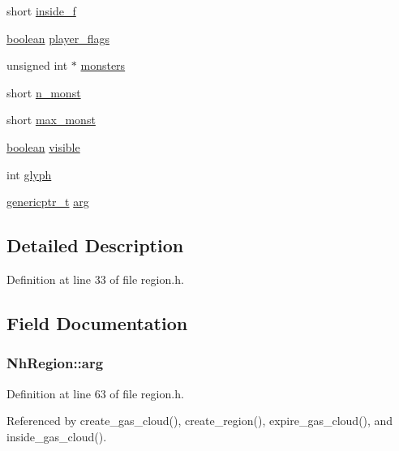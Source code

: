 \begin{DoxyCompactItemize}
\item 
short \hyperlink{structNhRegion_a91718cb4cbceb766dad22d61e5b407fe}{inside\+\_\+f}
\item 
\hyperlink{global_8h_a531b10dd351aa162d7dcccd1966308b8}{boolean} \hyperlink{structNhRegion_a640adecacc9ab6c30831b9b35f6c1e5d}{player\+\_\+flags}
\item 
unsigned int $\ast$ \hyperlink{structNhRegion_a22e5c3cedd81f1f8f83ee6badc4e0ceb}{monsters}
\item 
short \hyperlink{structNhRegion_a03e540a957b87fbd016dbee3c3c0cb9c}{n\+\_\+monst}
\item 
short \hyperlink{structNhRegion_a26e6ec350a157299cdd03820faf5948b}{max\+\_\+monst}
\item 
\hyperlink{global_8h_a531b10dd351aa162d7dcccd1966308b8}{boolean} \hyperlink{structNhRegion_a2ab12427b9c9d84da999feba4f7ea9cd}{visible}
\item 
int \hyperlink{structNhRegion_ad20e42df1758728ae40670635d7c6af5}{glyph}
\item 
\hyperlink{tradstdc_8h_ad4a7dab7269b4b00e3c7c7d2e66f31cd}{genericptr\+\_\+t} \hyperlink{structNhRegion_a1d28f1a676034cbfc83cc0eb0a8a6064}{arg}
\end{DoxyCompactItemize}


\subsection{Detailed Description}


Definition at line 33 of file region.\+h.



\subsection{Field Documentation}
\hypertarget{structNhRegion_a1d28f1a676034cbfc83cc0eb0a8a6064}{
\subsubsection[{arg}]{ Nh\+Region\+::arg}}\label{structNhRegion_a1d28f1a676034cbfc83cc0eb0a8a6064}


Definition at line 63 of file region.\+h.



Referenced by create\+\_\+gas\+\_\+cloud(), create\+\_\+region(), expire\+\_\+gas\+\_\+cloud(), and inside\+\_\+gas\+\_\+cloud().

